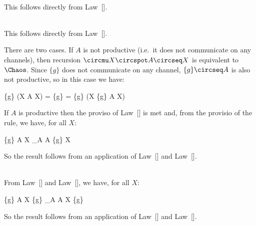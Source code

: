 \begin{crproof}\hfill\\
  This follows directly from Law~[].
\end{crproof}

\begin{crproof}\hfill\\
  This follows directly from Law~[].
\end{crproof}

\pagebreak
\begin{crproof}
    There are two cases. 
    If $A$ is not productive (i.e.\ it does not communicate on any
    channels), then recursion $\circmu X \circspot A \circseq X$ is
    equivalent to $\Chaos$.
    Since $\{g\}$ does not communicate on any channel,
    $\{g\} \circseq A$ is also not productive, so in this case we have:
    \begin{circus}
      \{g\} \circseq (\circmu X \circspot A \circseq X)
      =
      \{g\} \circseq \Chaos
      =
      \{g\} \circseq (\circmu X \circspot \{g\} \circseq A \circseq X)
    \end{circus}
    
    If $A$ is productive then the proviso of
    Law~[] is met and, from the provisio
    of the rule, we have, for all $X$:
    \begin{circus}
      \{g\} \circseq A \circseq X \circrefines_A A \circseq \{g\} \circseq X
    \end{circus}
    So the result follows from an application of
    Law~[]
    and
    Law~[].
\end{crproof}

\begin{crproof}\hfill\\
  From Law~[] and
  Law~[], we have, for all $X$:
    \begin{circus}
      \{g\} \circseq A \circseq X \circseq \{g\} \circrefines_A A \circseq X \circseq \{g\}
    \end{circus}
    So the result follows from an application of
    Law~[]
    and 
    Law~[].
\end{crproof}

